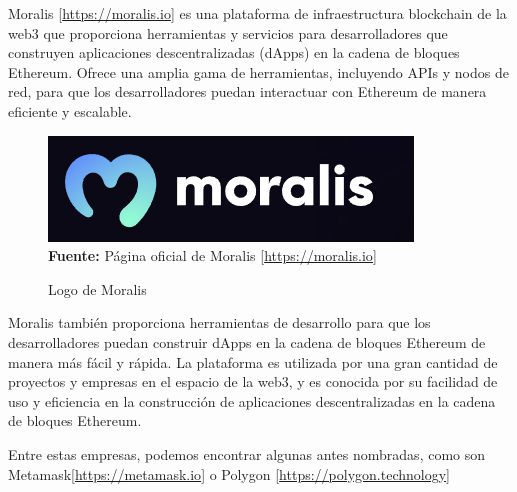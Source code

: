 Moralis [\url{https://moralis.io}] es una plataforma de infraestructura
blockchain de la web3 que proporciona herramientas y servicios para
desarrolladores que construyen aplicaciones descentralizadas (dApps) en la
cadena de bloques Ethereum. Ofrece una amplia gama de herramientas, incluyendo
APIs y nodos de red, para que los desarrolladores puedan interactuar con
Ethereum de manera eficiente y escalable.
\begin{figure}[htb!]
    \centering
    \caption{Logo de Moralis}
    \label{fig:moralis-logo}
    \centering
    \includegraphics[scale=0.5]{./Ilustraciones/logos/Moralis-logo.png}\\
    \textbf{Fuente:} Página oficial de Moralis [\url{https://moralis.io}]
\end{figure}
\hfill \break

Moralis también proporciona herramientas de desarrollo para que los
desarrolladores puedan construir dApps en la cadena de bloques Ethereum de
manera más fácil y rápida. La plataforma es utilizada por una gran cantidad de
proyectos y empresas en el espacio de la web3, y es conocida por su facilidad
de uso y eficiencia en la construcción de aplicaciones descentralizadas en la
cadena de bloques Ethereum.

Entre estas empresas, podemos encontrar algunas antes nombradas, como son
Metamask[\url{https://metamask.io}] o Polygon
    [\url{https://polygon.technology}]
